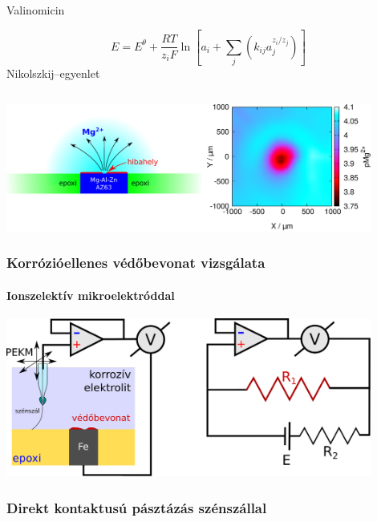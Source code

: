 \documentclass{beamer}
\begin{document}
\begin{frame}
\begin{columns}[T]
\begin{column}{.48\textwidth}
Valinomicin
\vfill

\footnotesize
\begin{equation*}
        E=E^\theta + \frac{RT}{z_iF} \ln \left [ a_i + \sum_{j} \left ( k_{ij}a_j^{z_i/z_j} \right ) \right ]
        \end{equation*}
\normalsize
Nikolszkij--egyenlet
\end{column}%
\end{columns}
\end{frame}

\begin{frame}
	\centering
	\includegraphics[width=0.9\textwidth]{hiba.eps}
	\frametitle{Korrózióellenes védőbevonat vizsgálata}
	\framesubtitle{Ionszelektív mikroelektróddal}
\end{frame}

\begin{frame}
	\centering
	\includegraphics[width=0.9\textwidth]{whisker.eps}
	\frametitle{Direkt kontaktusú pásztázás szénszállal}
\end{frame}
\end{document}
